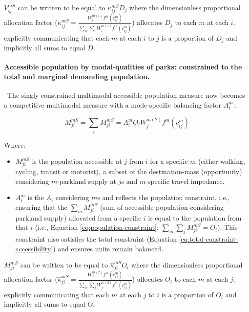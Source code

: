 \documentclass[
11pt, %
oneside, %
english, %
singlespacing, %
]{macthesis} %
\def\tightlist{}
\begin{document}
\(V_{ij}^{mS}\) can be written to be equal to \(\kappa_{ij}^{mS} D_j\) where the dimensionless proportional allocation factor (\(\kappa_{ij}^{mS} = \frac{W_i^{m(1)} f^m(c^m_{ij})}{\sum_m\sum_i W_i^{m(1)} f^m(c^m_{ij})}\)) allocates \(D_j\) to each \(m\) at each \(i\), explicitly communicating that each \(m\) at each \(i\) to \(j\) is a proportion of \(D_j\) and implicitly all sums to equal \(D\).

\paragraph{Accessible population by modal-qualities of parks: constrained to the total and marginal demanding population.}\label{accessible-population-by-modal-qualities-of-parks-constrained-to-the-total-and-marginal-demanding-population.}

~The singly constrained multimodal accessible population measure now becomes a competitive multimodal measure with a mode-specific balancing factor \(A_i^{m}\)::

\begin{equation}
\label{eq:singly-constrained-multimodal-market-park}
M^{mS}_{ji} = \sum_i M^{mS}_{ji} = A_i^{m} O_i W_j^{m(2)} f^m(c^m_{ij})
\end{equation} 

Where:

\begin{itemize}
\tightlist
\item
  \(M^{mS}_{ji}\) is the population accessible at \(j\) from \(i\) for a specific \(m\) (either walking, cycling, transit or motorist), a subset of the destination-mass (opportunity) considering \(m\)-parkland supply at \(j\)s and \(m\)-specific travel impedance.
\item
  \(A_i^{m}\) is the \(A_i\) considering \(m\)s and reflects the population constraint, i.e., ensuring that the \(\sum_m M^{mS}_{ji}\) (sum of accessible population considering parkland supply) allocated from a specific \(i\) is equal to the population from that \(i\) (i.e., Equation \ref{eq:population-constraint}: \(\sum_m \sum_j M^{mS}_{ji} = O_i\)). This constraint also satisfies the total constraint (Equation \ref{eq:total-constraint-accessibility}) and ensures units remain balanced.
\end{itemize}

\(M_{ji}^{mS}\) can be written to be equal to \(\hat \kappa_{ji}^{mS} O_i\) where the dimensionless proportional allocation factor (\(\hat \kappa_{ji}^{mS} =  \frac{W_j^{m(2)} f^m(c^m_{ij})}{\sum_m\sum_j W_j^{m(2)} f^m(c^m_{ij})}\)) allocates \(O_i\) to each \(m\) at each \(j\), explicitly communicating that each \(m\) at each \(j\) to \(i\) is a proportion of \(O_i\) and implicitly all sums to equal \(O\).
\end{document}
